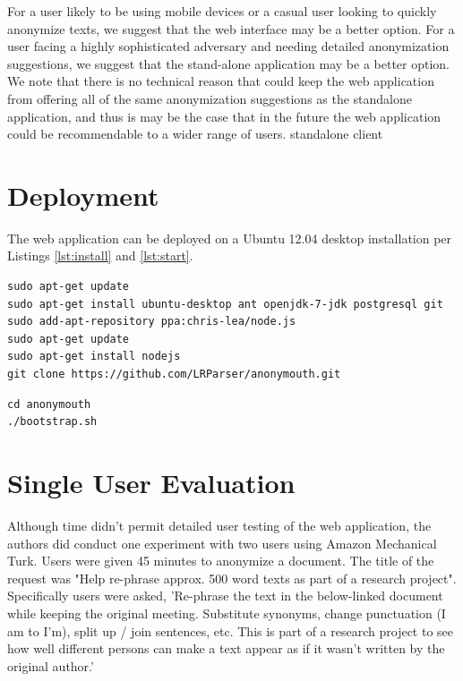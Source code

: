 \documentclass[letterpaper]{article}
\begin{document}
For a user likely to be using mobile devices or a casual user looking
to quickly anonymize texts, we suggest that the web interface may be a
better option. For a user facing a highly sophisticated adversary and
needing detailed anonymization suggestions, we suggest that the
stand-alone application may be a better option. We note that there is
no technical reason that could keep the web application from offering
all of the same anonymization suggestions as the standalone
application, and thus is may be the case that in the future the web
application could be recommendable to a wider range of users.
standalone client

\section{Deployment}

The web application can be deployed on a Ubuntu 12.04 desktop
installation per Listings \ref{lst:install} and \ref{lst:start}.

\begin{lstlisting}[caption={Install Dependencies},label={lst:install}]
sudo apt-get update
sudo apt-get install ubuntu-desktop ant openjdk-7-jdk postgresql git
sudo add-apt-repository ppa:chris-lea/node.js
sudo apt-get update
sudo apt-get install nodejs
git clone https://github.com/LRParser/anonymouth.git
\end{lstlisting}

\begin{lstlisting}[caption={Start Service},label={lst:start}]
cd anonymouth
./bootstrap.sh
\end{lstlisting}

\section{Single User Evaluation}

Although time didn't permit detailed user testing of the web
application, the authors did conduct one experiment with two users
using Amazon Mechanical Turk. Users were given 45 minutes to anonymize
a document. The title of the request was "Help re-phrase approx. 500
word texts as part of a research project". Specifically users were
asked, 'Re-phrase the text in the below-linked document while keeping
the original meeting. Substitute synonyms, change punctuation (I am to
I'm), split up / join sentences, etc. This is part of a research
project to see how well different persons can make a text appear as if
it wasn't written by the original author.'
\end{document}
